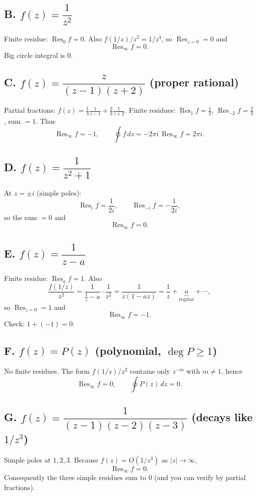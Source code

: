 \documentclass[12pt,a4paper]{article}
\DeclareMathOperator{\Res}{Res}
\begin{document}
	\subsection*{B. $f(z)=\dfrac{1}{z^{2}}$}
	Finite residue: $\Res_{0} f=0$. Also $f(1/z)/z^2=1/z^{4}$, so $\Res_{z=0}=0$ and
	\[
	\boxed{\Res_{\infty} f=0}.
	\]
	Big circle integral is $0$.
	
	\subsection*{C. $f(z)=\dfrac{z}{(z-1)(z+2)}$ (proper rational)}
	Partial fractions: $f(z)=\tfrac{1}{3}\tfrac{1}{z-1}+\tfrac{2}{3}\tfrac{1}{z+2}$.
	Finite residues: $\Res_{1}f=\tfrac13$, $\Res_{-2}f=\tfrac23$, sum $=1$.
	Thus
	\[
	\boxed{\Res_{\infty} f=-1},\qquad
	\oint f\,dz = -2\pi i\,\Res_\infty f = 2\pi i.
	\]
	
	\subsection*{D. $f(z)=\dfrac{1}{z^{2}+1}$}
	At $z=\pm i$ (simple poles):
	\[
	\Res_{i} f=\frac{1}{2i},\qquad \Res_{-i} f=-\frac{1}{2i},
	\]
	so the sum $=0$ and
	\[
	\boxed{\Res_{\infty} f=0}.
	\]
	
	\subsection*{E. $f(z)=\dfrac{1}{z-a}$}
	Finite residue: $\Res_{a} f=1$.
	Also
	\[
	\frac{f(1/z)}{z^2}=\frac{1}{\tfrac{1}{z}-a}\cdot\frac{1}{z^2}
	=\frac{1}{z(1-az)}=\frac{1}{z}+\underbrace{a}_{\text{regular}}+\cdots,
	\]
	so $\Res_{z=0}=1$ and
	\[
	\boxed{\Res_{\infty} f=-1}.
	\]
	Check: $1+(-1)=0$.
	
	\subsection*{F. $f(z)=P(z)$ (polynomial, $\deg P\ge1$)}
	No finite residues. The form $f(1/z)/z^2$ contains only $z^{-m}$ with $m\ne1$, hence
	\[
	\boxed{\Res_{\infty} f=0},\qquad \oint P(z)\,dz=0.
	\]
	
	\subsection*{G. $f(z)=\dfrac{1}{(z-1)(z-2)(z-3)}$ (decays like $1/z^{3}$)}
	Simple poles at $1,2,3$. Because $f(z)=O(1/z^{3})$ as $|z|\to\infty$,
	\[
	\boxed{\Res_{\infty} f=0}.
	\]
	Consequently the three simple residues sum to $0$ (and you can verify by partial fractions).
	
\end{document}
